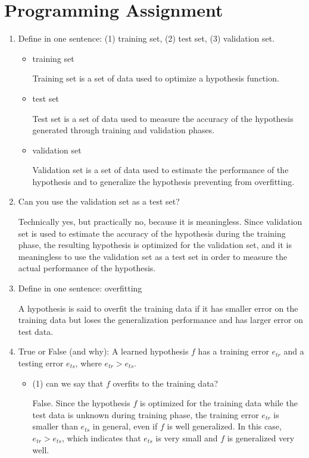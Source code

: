 \section{Programming Assignment}
\begin{enumerate}
\item Define in one sentence: (1) training set, (2) test set, (3) validation set.
\begin{itemize}
\item training set

Training set is a set of data used to optimize a hypothesis function.

\item test set

Test set is a set of data used to measure the accuracy of the hypothesis generated through training and validation phases.

\item validation set

Validation set is a set of data used to estimate the performance of the hypothesis and to generalize the hypothesis preventing from overfitting.

\end{itemize}

\item Can you use the validation set as a test set?

Technically yes, but practically no, because it is meaningless. Since validation set is used to estimate the accuracy of the hypothesis during the training phase, the resulting hypothesis is optimized for the validation set, and it is meaningless to use the validation set as a test set in order to measure the actual performance of the hypothesis.

\item Define in one sentence: overfitting

A hypothesis is said to overfit the training data if it has smaller error on the training data but loses the generalization performance and has larger error on test data.

\item True or False (and why): A learned hypothesis $f$ has a training error $e_{tr}$ and a testing error $e_{ts}$, where $e_{tr} > e_{ts}$.

\begin{itemize}
\item (1) can we say that $f$ overfits to the training data?

False. Since the hypothesis $f$ is optimized for the training data while the test data is unknown during training phase, the training error $e_{tr}$ is smaller than $e_{ts}$ in general, even if $f$ is well generalized. In this case, $e_{tr} > e_{ts}$, which indicates that $e_{ts}$ is very small and $f$ is generalized very well.


\end{itemize}
\end{enumerate}
